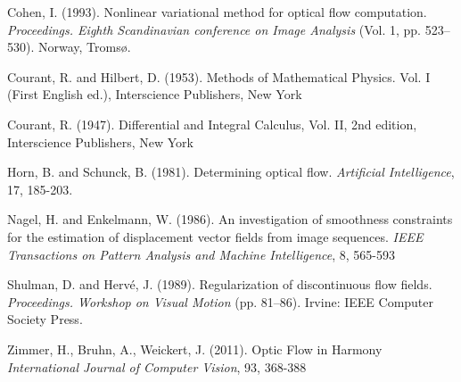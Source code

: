 \documentclass[10pt,a4paper]{article}
\begin{document}
\begin{thebibliography}{}

Cohen, I. (1993). Nonlinear variational method for optical flow computation. \emph{Proceedings. Eighth Scandinavian conference on Image Analysis} (Vol. 1, pp. 523–530). Norway, Tromsø.

Courant, R. and Hilbert, D. (1953). Methods of Mathematical Physics. Vol. I (First English ed.), Interscience Publishers, New York

Courant, R. (1947). Differential and Integral Calculus, Vol. II, 2nd edition, Interscience Publishers, New York


Horn, B. and Schunck, B. (1981). Determining optical flow. \emph{Artificial Intelligence}, 17, 185-203.

Nagel, H. and Enkelmann, W. (1986). An investigation of smoothness constraints for the estimation of displacement vector fields from image sequences. \emph{IEEE Transactions on Pattern Analysis and Machine Intelligence}, 8, 565-593

Shulman, D. and Hervé, J. (1989). Regularization of discontinuous flow fields. \emph{Proceedings. Workshop on Visual Motion} (pp. 81–86). Irvine: IEEE Computer Society Press.

Zimmer, H., Bruhn, A., Weickert, J. (2011). Optic Flow in Harmony \emph{International Journal of Computer Vision}, 93, 368-388


\end{thebibliography}
\end{document}
